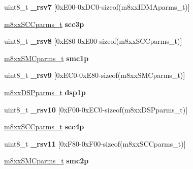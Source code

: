 \begin{DoxyCompactItemize}
\item 
\mbox{\label{structm8xx___a9f06b42543fb10a66e5094ccb22b5127}} 
uint8\+\_\+t {\bfseries \+\_\+rsv7} \mbox{[}0x\+E00-\/0x\+D\+C0-\/sizeof(m8xx\+I\+D\+M\+Aparms\+\_\+t)\mbox{]}
\item 
\mbox{\label{structm8xx___a444bf4ebaa8182b1a3c6990e61d39912}} 
\mbox{\hyperlink{structm8xxSCCparms__}{m8xx\+S\+C\+Cparms\+\_\+t}} {\bfseries scc3p}
\item 
\mbox{\label{structm8xx___ab1253291f4dc90671e8b98855b94d457}} 
uint8\+\_\+t {\bfseries \+\_\+rsv8} \mbox{[}0x\+E80-\/0x\+E00-\/sizeof(m8xx\+S\+C\+Cparms\+\_\+t)\mbox{]}
\item 
\mbox{\label{structm8xx___ae73330747aa98ca53850c2221766003b}} 
\mbox{\hyperlink{structm8xxSMCparms__}{m8xx\+S\+M\+Cparms\+\_\+t}} {\bfseries smc1p}
\item 
\mbox{\label{structm8xx___ac4c9a66e67dba392a339fc3e99adf5ec}} 
uint8\+\_\+t {\bfseries \+\_\+rsv9} \mbox{[}0x\+E\+C0-\/0x\+E80-\/sizeof(m8xx\+S\+M\+Cparms\+\_\+t)\mbox{]}
\item 
\mbox{\label{structm8xx___a68a7fd100e8941f8a3004b82178d9f42}} 
\mbox{\hyperlink{structm8xxDSPparms__}{m8xx\+D\+S\+Pparms\+\_\+t}} {\bfseries dsp1p}
\item 
\mbox{\label{structm8xx___a8481157065a27c47a2a05d2480103af0}} 
uint8\+\_\+t {\bfseries \+\_\+rsv10} \mbox{[}0x\+F00-\/0x\+E\+C0-\/sizeof(m8xx\+D\+S\+Pparms\+\_\+t)\mbox{]}
\item 
\mbox{\label{structm8xx___a77ad7d596ab15d860deab3f457ca41d0}} 
\mbox{\hyperlink{structm8xxSCCparms__}{m8xx\+S\+C\+Cparms\+\_\+t}} {\bfseries scc4p}
\item 
\mbox{\label{structm8xx___af62c9a20ce1bccd5609e3233e1869f36}} 
uint8\+\_\+t {\bfseries \+\_\+rsv11} \mbox{[}0x\+F80-\/0x\+F00-\/sizeof(m8xx\+S\+C\+Cparms\+\_\+t)\mbox{]}
\item 
\mbox{\label{structm8xx___a39bf2309d286bcbe99f8b249549a64fd}} 
\mbox{\hyperlink{structm8xxSMCparms__}{m8xx\+S\+M\+Cparms\+\_\+t}} {\bfseries smc2p}

\end{DoxyCompactItemize}
